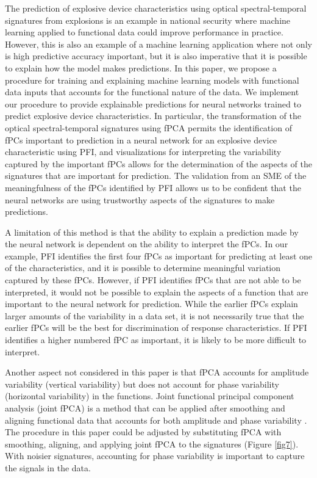 \documentclass[letterpaper]{article}
\begin{document}
The prediction of explosive device characteristics using optical spectral-temporal signatures from explosions is an example in national security where machine learning applied to functional data could improve performance in practice. However, this is also an example of a machine learning application where not only is high predictive accuracy important, but it is also imperative that it is possible to explain how the model makes predictions. In this paper, we propose a procedure for training and explaining machine learning models with functional data inputs that accounts for the functional nature of the data. We implement our procedure to provide explainable predictions for neural networks trained to predict explosive device characteristics. In particular, the transformation of the optical spectral-temporal signatures using fPCA permits the identification of fPCs important to prediction in a neural network for an explosive device characteristic using PFI, and visualizations for interpreting the variability captured by the important fPCs allows for the determination of the aspects of the signatures that are important for prediction. The validation from an SME of the meaningfulness of the fPCs identified by PFI allows us to be confident that the neural networks are using trustworthy aspects of the signatures to make predictions.

A limitation of this method is that the ability to explain a prediction made by the neural network is dependent on the ability to interpret the fPCs. In our example, PFI identifies the first four fPCs as important for predicting at least one of the characteristics, and it is possible to determine meaningful variation captured by these fPCs. However, if PFI identifies fPCs that are not able to be interpreted, it would not be possible to explain the aspects of a function that are important to the neural network for prediction. While the earlier fPCs explain larger amounts of the variability in a data set, it is not necessarily true that the earlier fPCs will be the best for discrimination of response characteristics. If PFI identifies a higher numbered fPC as important, it is likely to be more difficult to interpret.

Another aspect not considered in this paper is that fPCA accounts for amplitude variability (vertical variability) but does not account for phase variability (horizontal variability) in the functions. Joint functional principal component analysis (joint fPCA) is a method that can be applied after smoothing and aligning functional data that accounts for both amplitude and phase variability \cite{lee:2017,tucker:2013}. The procedure in this paper could be adjusted by substituting fPCA with smoothing, aligning, and applying joint fPCA to the signatures (Figure \ref{fig7}). With noisier signatures, accounting for phase variability is important to capture the signals in the data.
\end{document}
